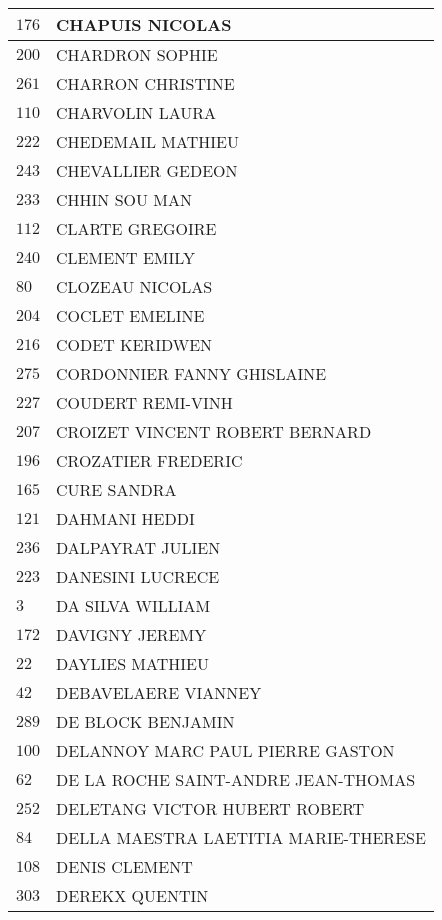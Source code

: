 \begin{xltabular}{\linewidth}{|l|X|}
    \hline
    $176$ & CHAPUIS NICOLAS \\
    \hline
    $200$ & CHARDRON SOPHIE \\
    \hline
    $261$ & CHARRON CHRISTINE \\
    \hline
    $110$ & CHARVOLIN LAURA \\
    \hline
    $222$ & CHEDEMAIL MATHIEU \\
    \hline
    $243$ & CHEVALLIER GEDEON \\
    \hline
    $233$ & CHHIN SOU MAN \\
    \hline
    $112$ & CLARTE GREGOIRE \\
    \hline
    $240$ & CLEMENT EMILY \\
    \hline
    $80$ & CLOZEAU NICOLAS \\
    \hline
    $204$ & COCLET EMELINE \\
    \hline
    $216$ & CODET KERIDWEN \\
    \hline
    $275$ & CORDONNIER FANNY GHISLAINE \\
    \hline
    $227$ & COUDERT REMI-VINH \\
    \hline
    $207$ & CROIZET VINCENT ROBERT BERNARD \\
    \hline
    $196$ & CROZATIER FREDERIC \\
    \hline
    $165$ & CURE SANDRA \\
    \hline
    $121$ & DAHMANI HEDDI \\
    \hline
    $236$ & DALPAYRAT JULIEN \\
    \hline
    $223$ & DANESINI LUCRECE \\
    \hline
    $3$ & DA SILVA WILLIAM \\
    \hline
    $172$ & DAVIGNY JEREMY \\
    \hline
    $22$ & DAYLIES MATHIEU \\
    \hline
    $42$ & DEBAVELAERE VIANNEY \\
    \hline
    $289$ & DE BLOCK BENJAMIN \\
    \hline
    $100$ & DELANNOY MARC PAUL PIERRE GASTON \\
    \hline
    $62$ & DE LA ROCHE SAINT-ANDRE JEAN-THOMAS \\
    \hline
    $252$ & DELETANG VICTOR HUBERT ROBERT \\
    \hline
    $84$ & DELLA MAESTRA LAETITIA MARIE-THERESE \\
    \hline
    $108$ & DENIS CLEMENT \\
    \hline
    $303$ & DEREKX QUENTIN \\

\end{xltabular}
